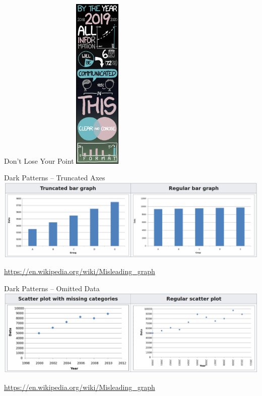\documentclass[ignorenonframetext,xcolor=x11names]{beamer}
\begin{document}
\begin{frame}{Don't Lose Your Point}
\centering
  \includegraphics[height=3.3in]{xkcd_tall_infographics.png}
\end{frame}

\begin{frame}{Dark Patterns -- Truncated Axes}
\centering
\includegraphics[width=\textwidth]{screen3.png}

\scriptsize\url{https://en.wikipedia.org/wiki/Misleading_graph}
\end{frame}

\begin{frame}{Dark Patterns -- Omitted Data}
\centering
\includegraphics[width=\textwidth]{screen5.png}

\scriptsize\url{https://en.wikipedia.org/wiki/Misleading_graph}
\end{frame}
\end{document}
